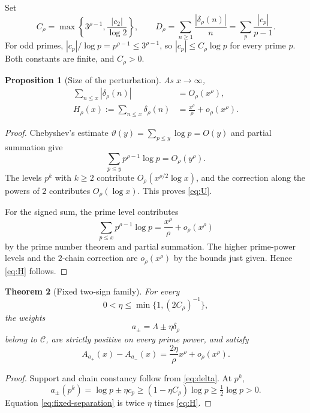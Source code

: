 \documentclass[11pt,a4paper]{amsart}
\newtheorem{theorem}{Theorem}[section]
\newtheorem{proposition}[theorem]{Proposition}
\theoremstyle{definition}
\newcommand{\1}{\mathbf 1}
\begin{document}
Set
\begin{equation}\label{eq:constants}
 C_\rho=\max\left\{3^{\rho-1},\frac{|c_2|}{\log2}\right\},
 \qquad
 D_\rho=\sum_{n\ge1}\frac{|\delta_\rho(n)|}{n}
 =\sum_p\frac{|c_p|}{p-1}.
\end{equation}
For odd primes, $|c_p|/\log p=p^{\rho-1}\le3^{\rho-1}$, so
$|c_p|\le C_\rho\log p$ for every prime $p$.  Both constants are finite,
and $C_\rho>0$.

\begin{proposition}[Size of the perturbation]\label{prop:fixed-sums}
As $x\to\infty$,
\begin{align}
 \sum_{n\le x}|\delta_\rho(n)|&=O_\rho(x^\rho),\label{eq:U}\\
 H_\rho(x):=\sum_{n\le x}\delta_\rho(n)
 &=\frac{x^\rho}{\rho}+o_\rho(x^\rho).\label{eq:H}
\end{align}
\end{proposition}

\begin{proof}
Chebyshev's estimate $\vartheta(y)=\sum_{p\le y}\log p=O(y)$ and partial summation give
\[
 \sum_{p\le y}p^{\rho-1}\log p=O_\rho(y^\rho).
\]
The levels $p^k$ with $k\ge2$ contribute $O_\rho(x^{\rho/2}\log x)$, and the correction along the powers of $2$ contributes $O_\rho(\log x)$.  This proves \eqref{eq:U}.

For the signed sum, the prime level contributes
\[
 \sum_{p\le x}p^{\rho-1}\log p
 =\frac{x^\rho}{\rho}+o_\rho(x^\rho)
\]
by the prime number theorem and partial summation.  The higher prime-power levels and the $2$-chain correction are $o_\rho(x^\rho)$ by the bounds just given.  Hence \eqref{eq:H} follows.
\end{proof}

\begin{theorem}[Fixed two-sign family]\label{thm:fixed-pair}
For every
\begin{equation}\label{eq:eta-small}
 0<\eta\le \min\{1,(2C_\rho)^{-1}\},
\end{equation}
the weights
\[
 a_\pm=\Lambda\pm\eta\delta_\rho
\]
belong to $\mathcal C$, are strictly positive on every prime power, and satisfy
\begin{equation}\label{eq:fixed-separation}
 A_{a_+}(x)-A_{a_-}(x)
 =\frac{2\eta}{\rho}x^\rho+o_\rho(x^\rho).
\end{equation}
\end{theorem}

\begin{proof}
Support and chain constancy follow from \eqref{eq:delta}.  At $p^k$,
\[
 a_\pm(p^k)=\log p\pm\eta c_p
 \ge(1-\eta C_\rho)\log p\ge\tfrac12\log p>0.
\]
Equation \eqref{eq:fixed-separation} is twice $\eta$ times \eqref{eq:H}.
\end{proof}
\end{document}

